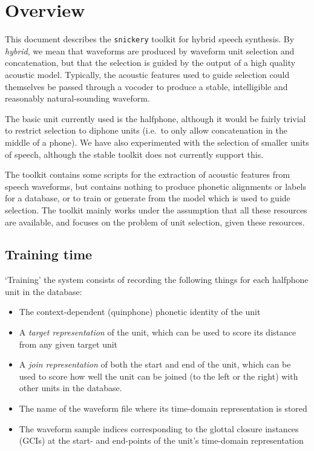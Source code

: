 

\section{Overview}

This document describes the {\tt snickery} toolkit for hybrid speech synthesis. By \textit{hybrid}, we mean that waveforms are produced by waveform unit selection and concatenation, but that the selection is guided by the output of a high quality acoustic model. Typically, the acoustic features used to guide selection could themselves be passed through a vocoder to produce a stable, intelligible and reasonably natural-sounding waveform. 

The basic unit currently used is the halfphone, although it would be fairly trivial to restrict selection to diphone units (i.e.\ to only allow concatenation in the middle of a phone). We have also experimented with the selection of smaller units of speech, although the stable toolkit does not currently support this.

The toolkit contains some scripts for the extraction of acoustic features from speech waveforms, but contains nothing to produce phonetic alignments or labels for a database, or to train or generate from the model which is used to guide selection. The toolkit mainly works under the assumption that all these resources are available, and focuses on the problem of unit selection, given these resources. 



\subsection{Training time}

`Training' the system consists of recording the following things for each halfphone unit in the database:

\begin{itemize}
    \item The context-dependent (quinphone) phonetic identity of the unit %
    \item A \textit{target representation} of the unit, which can be used to score its distance from any given target unit  %
    \item A \textit{join representation} of both the start and end of the unit, which can be used to score how well the unit can be joined (to the left or the right) with other units in the database. %
    \item The name of the waveform file where its time-domain representation is stored %
    \item The waveform sample indices corresponding to the glottal closure instances (GCIs) at the start- and end-points of the unit's time-domain representation %
\end{itemize}

